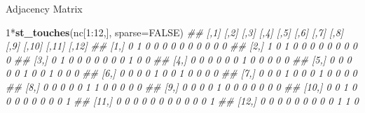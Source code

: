 \documentclass[11pt,ignorenonframetext,]{beamer}
\newenvironment{Shaded}{}{}
\newcommand{\CommentTok}[1]{\textcolor[rgb]{0.38,0.63,0.69}{\textit{#1}}}
\newcommand{\DataTypeTok}[1]{\textcolor[rgb]{0.56,0.13,0.00}{#1}}
\newcommand{\DecValTok}[1]{\textcolor[rgb]{0.25,0.63,0.44}{#1}}
\newcommand{\KeywordTok}[1]{\textcolor[rgb]{0.00,0.44,0.13}{\textbf{#1}}}
\newcommand{\NormalTok}[1]{#1}
\newcommand{\OperatorTok}[1]{\textcolor[rgb]{0.40,0.40,0.40}{#1}}
\newcommand{\OtherTok}[1]{\textcolor[rgb]{0.00,0.44,0.13}{#1}}
\let\oldShaded\Shaded
\let\endoldShaded\endShaded
\renewenvironment{Shaded}{\footnotesize\begin{spacing}{0.9}\oldShaded}{\endoldShaded\end{spacing}}
\let\oldverbatim\verbatim
\let\endoldverbatim\endverbatim
\newcommand{\scriptoutput}{
  \renewenvironment{Shaded}{\scriptsize\begin{spacing}{0.9}\oldShaded}{\endoldShaded\end{spacing}}
  \renewenvironment{verbatim}{\scriptsize\begin{spacing}{0.9}\oldverbatim}{\endoldverbatim\end{spacing}}
}
\begin{document}
\begin{frame}[fragile,t]{Adjacency Matrix}
\protect\hypertarget{adjacency-matrix}{}

\scriptoutput

\begin{Shaded}
\begin{Highlighting}[]
\DecValTok{1}\OperatorTok{*}\KeywordTok{st_touches}\NormalTok{(nc[}\DecValTok{1}\OperatorTok{:}\DecValTok{12}\NormalTok{,], }\DataTypeTok{sparse=}\OtherTok{FALSE}\NormalTok{)}
\CommentTok{##       [,1] [,2] [,3] [,4] [,5] [,6] [,7] [,8] [,9] [,10] [,11] [,12]}
\CommentTok{##  [1,]    0    1    0    0    0    0    0    0    0     0     0     0}
\CommentTok{##  [2,]    1    0    1    0    0    0    0    0    0     0     0     0}
\CommentTok{##  [3,]    0    1    0    0    0    0    0    0    0     1     0     0}
\CommentTok{##  [4,]    0    0    0    0    0    0    1    0    0     0     0     0}
\CommentTok{##  [5,]    0    0    0    0    0    1    0    0    1     0     0     0}
\CommentTok{##  [6,]    0    0    0    0    1    0    0    1    0     0     0     0}
\CommentTok{##  [7,]    0    0    0    1    0    0    0    1    0     0     0     0}
\CommentTok{##  [8,]    0    0    0    0    0    1    1    0    0     0     0     0}
\CommentTok{##  [9,]    0    0    0    0    1    0    0    0    0     0     0     0}
\CommentTok{## [10,]    0    0    1    0    0    0    0    0    0     0     0     1}
\CommentTok{## [11,]    0    0    0    0    0    0    0    0    0     0     0     1}
\CommentTok{## [12,]    0    0    0    0    0    0    0    0    0     1     1     0}
\end{Highlighting}
\end{Shaded}

\end{frame}
\end{document}
